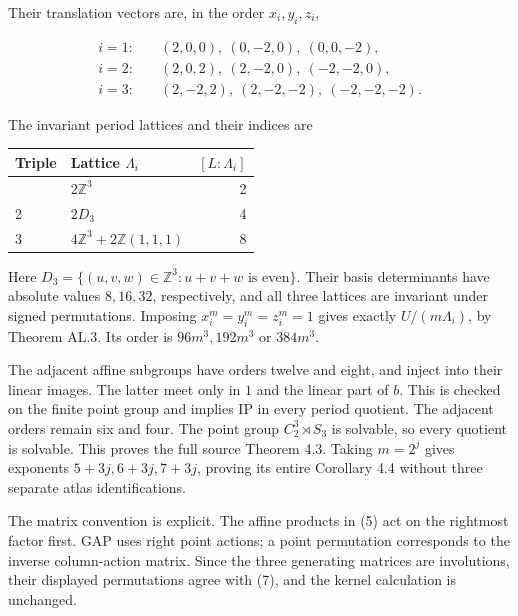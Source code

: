 Their translation vectors are, in the order \(x_i,y_i,z_i\),

\[\begin{aligned}
i=1:&\quad (2,0,0),\ (0,-2,0),\ (0,0,-2),\\
i=2:&\quad (2,0,2),\ (2,-2,0),\ (-2,-2,0),\\
i=3:&\quad (2,-2,2),\ (2,-2,-2),\ (-2,-2,-2).
\end{aligned}\]

The invariant period lattices and their indices are

{
\begin{longtable}[]{@{}llr@{}}
\toprule\noalign{}
Triple & Lattice \(\Lambda_i\) & \([L:\Lambda_i]\) \\
\midrule\noalign{}
\endhead
\bottomrule\noalign{}
\endlastfoot
1 & \(2\mathbb Z^3\) & 2 \\
2 & \(2D_3\) & 4 \\
3 & \(4\mathbb Z^3+2\mathbb Z(1,1,1)\) & 8 \\
\end{longtable}
}

Here \(D_3=\{(u,v,w)\in\mathbb Z^3:u+v+w\text{ is even}\}\). Their
basis determinants have absolute values \(8,16,32\), respectively, and
all three lattices are invariant under signed permutations. Imposing
\(x_i^m=y_i^m=z_i^m=1\) gives exactly \(U/(m\Lambda_i)\), by Theorem AL.3.
Its order is \(96m^3,192m^3\) or \(384m^3\).

The adjacent affine subgroups have orders twelve and eight, and inject
into their linear images. The latter meet only in \(1\) and the linear
part of \(b\). This is checked on the finite point group and implies IP
in every period quotient. The adjacent orders remain six and four.
The point group \(C_2^3\rtimes S_3\) is solvable, so every quotient is
solvable. This proves the full source Theorem 4.3. Taking \(m=2^j\) gives
exponents \(5+3j,6+3j,7+3j\), proving its entire Corollary 4.4 without
three separate atlas identifications.

The matrix convention is explicit. The affine products in (5) act on
the rightmost factor first. GAP uses right point actions; a point
permutation corresponds to the inverse column-action matrix. Since
the three generating matrices are involutions, their displayed
permutations agree with (7), and the kernel calculation is unchanged.
